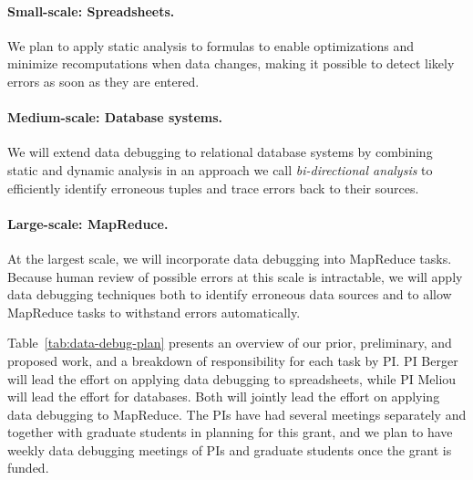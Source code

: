 \paragraph{Small-scale: Spreadsheets.} We plan to apply static
analysis to formulas to enable optimizations and minimize
recomputations when data changes, making it possible to detect
likely errors as soon as they are entered.

\paragraph{Medium-scale: Database systems.} We will extend data debugging to
relational database systems by combining static and dynamic analysis
in an approach we call \emph{bi-directional
  analysis} to efficiently identify erroneous tuples and trace errors back to their sources.

\paragraph{Large-scale: MapReduce.} At the largest scale, we will incorporate data debugging
into MapReduce tasks. Because human review of possible errors at this
scale is intractable, we will apply data debugging techniques both to
identify erroneous data sources and to allow MapReduce tasks to
withstand errors automatically.

Table~\ref{tab:data-debug-plan} presents an overview of our prior,
preliminary, and proposed work, and a breakdown of responsibility for
each task by PI. PI Berger will lead the effort on applying data
debugging to spreadsheets, while PI Meliou will lead the effort for
databases. Both will jointly lead the effort on applying data
debugging to MapReduce. The PIs have had several meetings separately
and together with graduate students in planning for this grant, and we
plan to have weekly data debugging meetings of PIs and graduate
students once the grant is funded.

